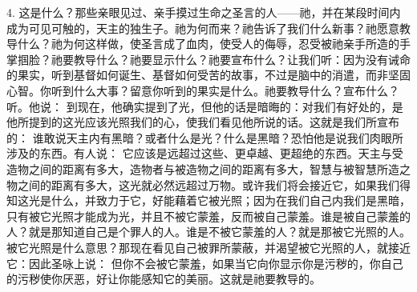 4.  这是什么？那些亲眼见过、亲手摸过生命之圣言的人——祂，并在某段时间内成为可见可触的，天主的独生子。祂为何而来？祂告诉了我们什么新事？祂愿意教导什么？祂为何这样做，使圣言成了血肉，使受人的侮辱，忍受被祂亲手所造的手掌掴脸？祂要教导什么？祂要显示什么？祂要宣布什么？让我们听：因为没有诫命的果实，听到基督如何诞生、基督如何受苦的故事，不过是脑中的消遣，而非坚固心智。你听到什么大事？留意你听到的果实是什么。祂要教导什么？宣布什么？听。他说： 到现在，他确实提到了光，但他的话是暗晦的：对我们有好处的，是他所提到的这光应该光照我们的心，使我们看见他所说的话。这就是我们所宣布的： 谁敢说天主内有黑暗？或者什么是光？什么是黑暗？恐怕他是说我们肉眼所涉及的东西。有人说： 它应该是远超过这些、更卓越、更超绝的东西。天主与受造物之间的距离有多大，造物者与被造物之间的距离有多大，智慧与被智慧所造之物之间的距离有多大，这光就必然远超过万物。或许我们将会接近它，如果我们得知这光是什么，并致力于它，好能藉着它被光照；因为在我们自己内我们是黑暗，只有被它光照才能成为光，并且不被它蒙羞，反而被自己蒙羞。谁是被自己蒙羞的人？就是那知道自己是个罪人的人。谁是不被它蒙羞的人？就是那被它光照的人。被它光照是什么意思？那现在看见自己被罪所蒙蔽，并渴望被它光照的人，就接近它：因此圣咏上说： 但你不会被它蒙羞，如果当它向你显示你是污秽的，你自己的污秽使你厌恶，好让你能感知它的美丽。这就是祂要教导的。\par

